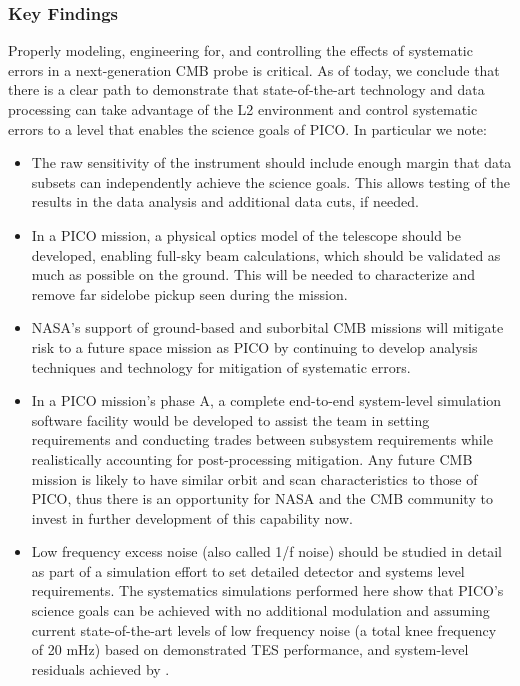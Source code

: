 \documentclass[PICOReport.tex]{subfiles}
\begin{document}
\subsubsection{Key Findings}
Properly modeling, engineering for, and controlling the effects of systematic errors in a
next-generation CMB probe is critical.  As of today, we conclude that there is a clear path to demonstrate that state-of-the-art technology and data processing can take advantage of the L2 environment and control systematic errors to a level that enables the science goals of PICO. In particular we note:
\begin{itemize}
\item The raw sensitivity of the instrument should include enough margin
that data subsets can independently achieve the science goals.
This allows testing of the results in the data analysis and additional
data cuts, if needed.
\item In a PICO mission, a physical optics model of the telescope should be developed, enabling full-sky beam calculations, which should be validated as much as possible on the ground.  This will be needed to characterize and remove far sidelobe pickup seen during the mission. 
\item NASA's support of ground-based and suborbital CMB missions will mitigate risk to a future space mission as PICO by continuing to develop analysis techniques and technology for mitigation of systematic errors.

\item In a PICO mission's phase A, a complete end-to-end system-level
simulation software facility would be developed to assist the team in setting 
requirements and conducting trades between subsystem requirements while
realistically accounting for post-processing mitigation.  Any future
CMB mission is likely to have similar orbit  
and scan characteristics to those of PICO, thus there is an opportunity for NASA and
the CMB community to invest in further development of this capability now.
\item Low frequency excess noise (also called 1/f noise) should be studied in detail as part of a simulation effort to set detailed detector and systems level requirements.  The systematics simulations performed here show that PICO's science goals can be achieved with no additional modulation and assuming current state-of-the-art levels of low frequency noise (a total knee frequency of 20 mHz) based on demonstrated TES performance, and system-level residuals achieved by \planck.
\end{itemize}
\end{document}
